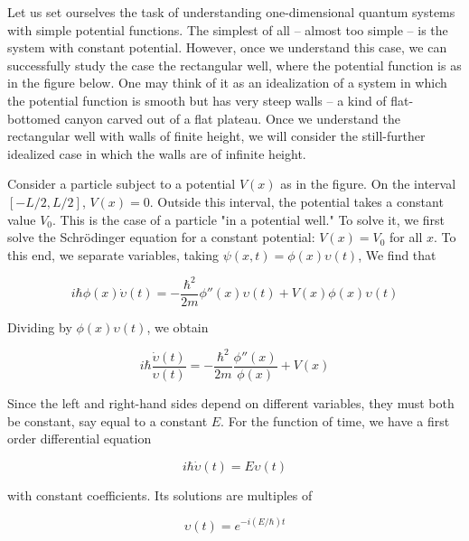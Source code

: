 Let us set ourselves the task of understanding one-dimensional quantum systems with simple potential functions.  The simplest of all -- almost too simple -- is the system with constant potential.  However, once we understand this case, we can successfully study the case the rectangular well, where the potential function is as in the figure below.  One may think of it as an idealization of a system in which the potential function is smooth but has very steep walls -- a kind of flat-bottomed canyon carved out of a flat plateau.  Once we understand the rectangular well with walls of finite height, we will consider the still-further idealized case in which the walls are of infinite height.



Consider a particle subject to a potential $V(x)$ as in the figure. On the interval $[-L/2, L/2]$, $V(x) = 0$.  Outside this interval, the potential takes a constant value $V_0$.  This is the case of a particle "in a potential well."  To solve it, we first solve the Schrödinger equation for a constant potential: $V(x) = V_0$ for all $x$.  To this end, we separate variables, taking $\psi(x,t) = \phi(x)\upsilon(t)$,  We find that

\begin{equation}
i\hbar \phi(x)\dot\upsilon(t) = -\frac{\hbar^2}{2m}\phi''(x)\upsilon(t) + V(x)\phi(x)\upsilon(t)
\end{equation}

Dividing by $\phi(x)\upsilon(t)$, we obtain

\begin{equation}
i\hbar \frac{\dot\upsilon(t)}{\upsilon(t)} = -\frac{\hbar^2}{2m}\frac{\phi''(x)}{\phi(x)} + V(x)
\end{equation}

Since the left and right-hand sides depend on different variables, they must both be constant, say equal to a constant $E$.  For the function of time, we have a first order differential equation 

\begin{equation}
i\hbar \dot\upsilon(t) = E\upsilon(t)
\end{equation}

with constant coefficients.  Its solutions are multiples of 

\begin{equation}
\upsilon(t) = e^{-i(E/\hbar)t}
\end{equation}

